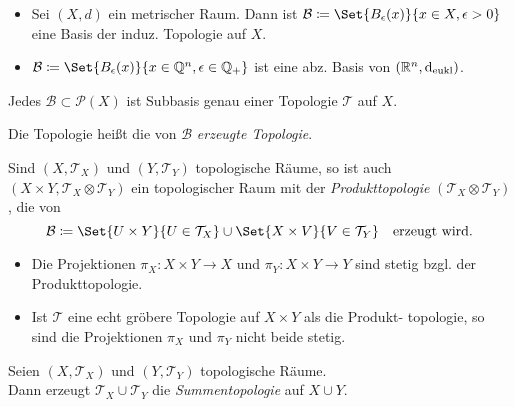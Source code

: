 \documentclass{cheat-sheet}
\newcommand{\Tau}{\mathcal{T}} %
\newcommand{\Pow}{\mathcal{P}} %
\begin{document}
\begin{bspe}
  \begin{itemize}
    \item Sei $(X, d)$ ein metrischer Raum. Dann ist $\mathcal{B} \coloneqq \Set{B_\epsilon(x)}{x \in X, \epsilon > 0}$ eine Basis der induz. Topologie auf $X$.
    \item $\mathcal{B} \coloneqq \Set{B_\epsilon(x)}{x \in \Q^n, \epsilon \in \Q_{+}}$ ist eine abz. Basis von $(\mathbb{R}^n, \mathrm{d}_{\text{eukl}})$.
  \end{itemize}
\end{bspe}

\begin{prop}
  Jedes $\mathcal{B} \!\subset\! \Pow(X)$ ist Subbasis genau einer Topologie $\Tau$ auf $X$.
\end{prop}

\begin{defn}
  Die Topologie heißt die von $\mathcal{B}$ \emph{erzeugte Topologie}.
\end{defn}

\begin{defn}
  Sind $(X, \Tau_X)$ und $(Y, \Tau_Y)$ topologische Räume, so ist auch $(X \times Y, \Tau_X \otimes \Tau_Y)$ ein topologischer Raum mit der \emph{Produkttopologie} $(\Tau_X \otimes \Tau_Y)$, die von
  \[
    \mathcal{B} \coloneqq \Set{U \times Y}{U \in \Tau_X} \cup \Set{X \times V}{V \in \Tau_Y}
    \quad \text{erzeugt wird.}
  \]
\end{defn}

\begin{prop}
  \begin{itemize}
    \item Die Projektionen $\pi_X : X \times Y \to X$ und $\pi_Y : X \times Y \to Y$ sind stetig bzgl. der Produkttopologie.
    \item Ist $\Tau$ eine echt gröbere Topologie auf $X \times Y$ als die Produkt- topologie, so sind die Projektionen $\pi_X$ und $\pi_Y$ nicht beide stetig.
  \end{itemize}
\end{prop}


\begin{defn}
  Seien $(X, \Tau_X)$ und $(Y, \Tau_Y)$ topologische Räume. \\
  Dann erzeugt $\Tau_X \cup \Tau_Y$ die \emph{Summentopologie} auf $X \cup Y$.
\end{defn}
\end{document}
